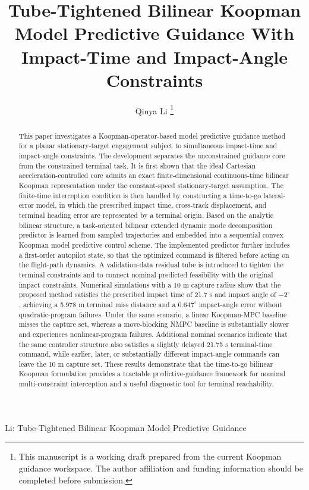 \documentclass[letterpaper,journal]{IEEEtran}
\begin{document}
\title{Tube-Tightened Bilinear Koopman Model Predictive Guidance With Impact-Time and Impact-Angle Constraints}

\author{Qiuya Li
\thanks{This manuscript is a working draft prepared from the current Koopman guidance workspace. The author affiliation and funding information should be completed before submission.}}

%
{Li: Tube-Tightened Bilinear Koopman Model Predictive Guidance}

\maketitle

\begin{abstract}
This paper investigates a Koopman-operator-based model predictive guidance method for a planar stationary-target engagement subject to simultaneous impact-time and impact-angle constraints. The development separates the unconstrained guidance core from the constrained terminal task. It is first shown that the ideal Cartesian acceleration-controlled core admits an exact finite-dimensional continuous-time bilinear Koopman representation under the constant-speed stationary-target assumption. The finite-time interception condition is then handled by constructing a time-to-go lateral-error model, in which the prescribed impact time, cross-track displacement, and terminal heading error are represented by a terminal origin. Based on the analytic bilinear structure, a task-oriented bilinear extended dynamic mode decomposition predictor is learned from sampled trajectories and embedded into a sequential convex Koopman model predictive control scheme. The implemented predictor further includes a first-order autopilot state, so that the optimized command is filtered before acting on the flight-path dynamics. A validation-data residual tube is introduced to tighten the terminal constraints and to connect nominal predicted feasibility with the original impact constraints. Numerical simulations with a 10 m capture radius show that the proposed method satisfies the prescribed impact time of 21.7 s and impact angle of $-2^\circ$, achieving a 5.978 m terminal miss distance and a $0.647^\circ$ impact-angle error without quadratic-program failures. Under the same scenario, a linear Koopman-MPC baseline misses the capture set, whereas a move-blocking NMPC baseline is substantially slower and experiences nonlinear-program failures. Additional nominal scenarios indicate that the same controller structure also satisfies a slightly delayed 21.75 s terminal-time command, while earlier, later, or substantially different impact-angle commands can leave the 10 m capture set. These results demonstrate that the time-to-go bilinear Koopman formulation provides a tractable predictive-guidance framework for nominal multi-constraint interception and a useful diagnostic tool for terminal reachability.
\end{abstract}
\end{document}
